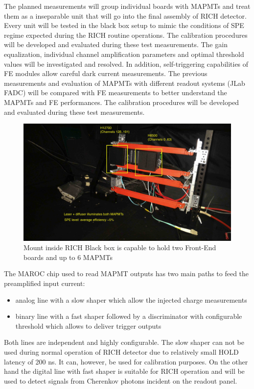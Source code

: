 The planned measurements will group individual boards with MAPMTs and treat them as a inseparable unit that will go into the final assembly of RICH detector.
Every unit will be tested in the black box setup to mimic the conditions of SPE regime expected during the RICH routine operations.
The calibration procedures will be developed and evaluated during these test measurements.
The gain equalization, individual channel amplification parameters and optimal threshold values will be investigated and resolved.
In addition, self-triggering capabilities of FE modules allow careful dark current measurements.
The previous measurements and evaluation of MAPMTs with different readout systems (JLab FADC) will be compared with FE measurements to better understand the MAPMTs and FE performances.
The calibration procedures will be developed and evaluated during these test measurements.

\begin{figure}[hbt]
  \centering
  \includegraphics[width=0.9\linewidth]{figures/LaserSetup.jpg}
  \caption{Mount inside RICH Black box is capable to hold two Front-End boards and up to 6 MAPMTs}
  \label{fig:FEmount}
\end{figure}

The MAROC chip used to read MAPMT outputs has two main paths to feed the preamplified input current:
\begin{itemize}
\item analog line with a slow shaper which allow the injected charge measurements
\item binary line with a fast shaper followed by a discriminator with configurable threshold which allows to deliver trigger outputs
\end{itemize}
Both lines are independent and highly configurable.
The slow shaper can not be used during normal operation of RICH detector due to relatively small HOLD latency of 200 ns.
It can, however, be used for calibration purposes.
On the other hand the digital line with fast shaper is suitable for RICH operation and will be used to detect signals from Cherenkov photons incident on the readout panel.

